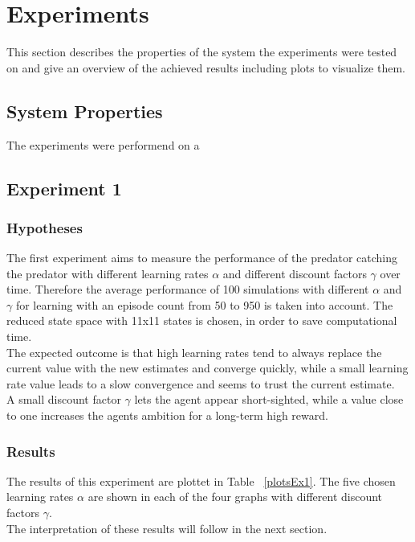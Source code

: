 \documentclass[11pt]{article}
\begin{document}
\section{Experiments}
This section describes the properties of the system the experiments were tested on and give an overview of the achieved results including plots to visualize them.

\subsection{System Properties}
The experiments were performend on a 

\subsection{Experiment 1}

\subsubsection{Hypotheses}
The first experiment aims to measure the performance of the predator catching the predator with different learning rates $\alpha$ and different discount factors $\gamma$ over time. Therefore the average performance of 100 simulations with different $\alpha$ and $\gamma$ for learning with an episode count from 50 to 950 is  taken into account. The reduced state space  with 11x11 states is chosen, in order to save computational time.\\
The expected outcome is that high learning rates tend to always replace the current value with the new estimates and converge quickly, while a small learning rate value leads to a slow convergence and seems to trust the current estimate. ~\cite{dar}\\
A small discount factor $\gamma$ lets the agent appear short-sighted, while a value close to one increases the agents ambition for a long-term high reward.

\subsubsection{Results}
The results of this experiment are plottet in Table ~\ref{plotsEx1}. The five chosen learning rates $\alpha$ are shown in each of the four graphs with different discount factors $\gamma$.\\
The interpretation of these results will follow in the next section.
\end{document}
